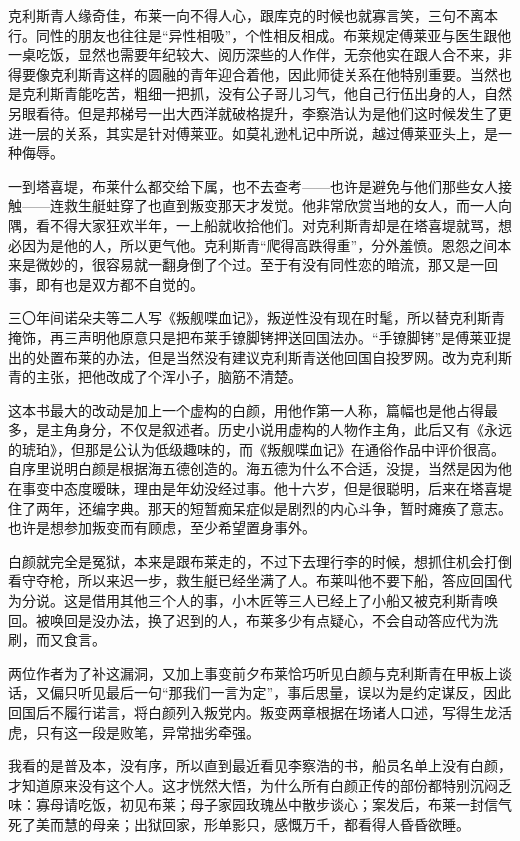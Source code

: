 \par 克利斯青人缘奇佳，布莱一向不得人心，跟库克的时候也就寡言笑，三句不离本行。同性的朋友也往往是“异性相吸”，个性相反相成。布莱规定傅莱亚与医生跟他一桌吃饭，显然也需要年纪较大、阅历深些的人作伴，无奈他实在跟人合不来，非得要像克利斯青这样的圆融的青年迎合着他，因此师徒关系在他特别重要。当然也是克利斯青能吃苦，粗细一把抓，没有公子哥儿习气，他自己行伍出身的人，自然另眼看待。但是邦梯号一出大西洋就破格提升，李察浩认为是他们这时候发生了更进一层的关系，其实是针对傅莱亚。如莫礼逊札记中所说，越过傅莱亚头上，是一种侮辱。
\par 一到塔喜堤，布莱什么都交给下属，也不去查考——也许是避免与他们那些女人接触——连救生艇蛀穿了也直到叛变那天才发觉。他非常欣赏当地的女人，而一人向隅，看不得大家狂欢半年，一上船就收拾他们。对克利斯青却是在塔喜堤就骂，想必因为是他的人，所以更气他。克利斯青“爬得高跌得重”，分外羞愤。恩怨之间本来是微妙的，很容易就一翻身倒了个过。至于有没有同性恋的暗流，那又是一回事，即有也是双方都不自觉的。
\par 三〇年间诺朵夫等二人写《叛舰喋血记》，叛逆性没有现在时髦，所以替克利斯青掩饰，再三声明他原意只是把布莱手镣脚铐押送回国法办。“手镣脚铐”是傅莱亚提出的处置布莱的办法，但是当然没有建议克利斯青送他回国自投罗网。改为克利斯青的主张，把他改成了个浑小子，脑筋不清楚。
\par 这本书最大的改动是加上一个虚构的白颜，用他作第一人称，篇幅也是他占得最多，是主角身分，不仅是叙述者。历史小说用虚构的人物作主角，此后又有《永远的琥珀》，但那是公认为低级趣味的，而《叛舰喋血记》在通俗作品中评价很高。自序里说明白颜是根据海五德创造的。海五德为什么不合适，没提，当然是因为他在事变中态度暧昧，理由是年幼没经过事。他十六岁，但是很聪明，后来在塔喜堤住了两年，还编字典。那天的短暂痴呆症似是剧烈的内心斗争，暂时瘫痪了意志。也许是想参加叛变而有顾虑，至少希望置身事外。
\par 白颜就完全是冤狱，本来是跟布莱走的，不过下去理行李的时候，想抓住机会打倒看守夺枪，所以来迟一步，救生艇已经坐满了人。布莱叫他不要下船，答应回国代为分说。这是借用其他三个人的事，小木匠等三人已经上了小船又被克利斯青唤回。被唤回是没办法，换了迟到的人，布莱多少有点疑心，不会自动答应代为洗刷，而又食言。
\par 两位作者为了补这漏洞，又加上事变前夕布莱恰巧听见白颜与克利斯青在甲板上谈话，又偏只听见最后一句“那我们一言为定”，事后思量，误以为是约定谋反，因此回国后不履行诺言，将白颜列入叛党内。叛变两章根据在场诸人口述，写得生龙活虎，只有这一段是败笔，异常拙劣牵强。
\par 我看的是普及本，没有序，所以直到最近看见李察浩的书，船员名单上没有白颜，才知道原来没有这个人。这才恍然大悟，为什么所有白颜正传的部份都特别沉闷乏味：寡母请吃饭，初见布莱；母子家园玫瑰丛中散步谈心；案发后，布莱一封信气死了美而慧的母亲；出狱回家，形单影只，感慨万千，都看得人昏昏欲睡。

